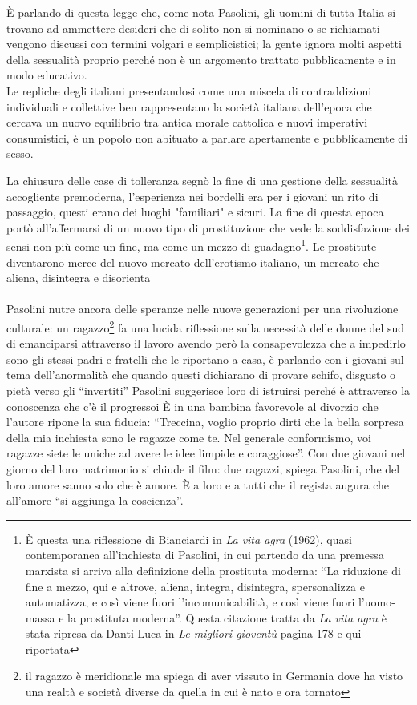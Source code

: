 È parlando di questa legge che, come nota Pasolini, gli uomini di tutta Italia si trovano ad ammettere desideri che di solito non si nominano o se richiamati vengono discussi con termini volgari e semplicistici; la gente ignora molti aspetti della sessualità proprio perché non è un argomento trattato pubblicamente e in modo educativo.
\\Le repliche degli italiani presentandosi come una miscela di contraddizioni individuali e collettive ben rappresentano la società italiana dell'epoca che cercava un nuovo equilibrio tra antica morale cattolica e nuovi imperativi consumistici, è un popolo non abituato a parlare apertamente e pubblicamente di sesso.

La chiusura delle case di tolleranza segnò la fine di una gestione della sessualità accogliente premoderna, l'esperienza nei bordelli era per i giovani un rito di passaggio, questi erano dei luoghi "familiari" e sicuri.
La fine di questa epoca portò all'affermarsi di un nuovo tipo di prostituzione che vede la soddisfazione dei sensi non più come un fine, ma come un mezzo di guadagno\footnote{È questa una riflessione di Bianciardi in \textit{La vita agra} (1962), quasi contemporanea all'inchiesta di Pasolini, in cui partendo da una premessa marxista si arriva alla definizione della prostituta moderna: \enquote{La riduzione di fine a mezzo, qui e altrove, aliena, integra, disintegra, spersonalizza e automatizza, e così viene fuori l'incomunicabilità, e così viene fuori l'uomo-massa e la prostituta moderna}. Questa citazione tratta da \textit{La vita agra} è stata ripresa da Danti Luca in \textit{Le migliori gioventù} pagina 178 e qui riportata}.
Le prostitute diventarono merce del nuovo mercato dell'erotismo italiano, un mercato che aliena, disintegra e disorienta

\paragraph{}Pasolini nutre ancora delle speranze nelle nuove generazioni per una rivoluzione culturale: un ragazzo\footnote{il ragazzo è meridionale ma spiega di aver vissuto in Germania dove ha visto una realtà e società diverse da quella in cui è nato e ora tornato} fa una lucida riflessione sulla necessità delle donne del sud di emanciparsi attraverso il lavoro avendo però la consapevolezza che a impedirlo sono gli stessi padri e fratelli che le riportano a casa, è parlando con i giovani sul tema dell'anormalità che quando questi dichiarano di provare schifo, disgusto o pietà verso gli \enquote{invertiti} Pasolini suggerisce loro di istruirsi perché è attraverso la conoscenza che c'è il progressoi
È in una bambina favorevole al divorzio che l'autore ripone la sua fiducia: \enquote{Treccina, voglio proprio dirti che la bella sorpresa della mia inchiesta sono le ragazze come te. Nel generale conformismo, voi ragazze siete le uniche ad avere le idee limpide e coraggiose}.
Con due giovani nel giorno del loro matrimonio si chiude il film: due ragazzi, spiega Pasolini, che del loro amore sanno solo che è amore.
È a loro e a tutti che il regista augura che all'amore \enquote{si aggiunga la coscienza}.

